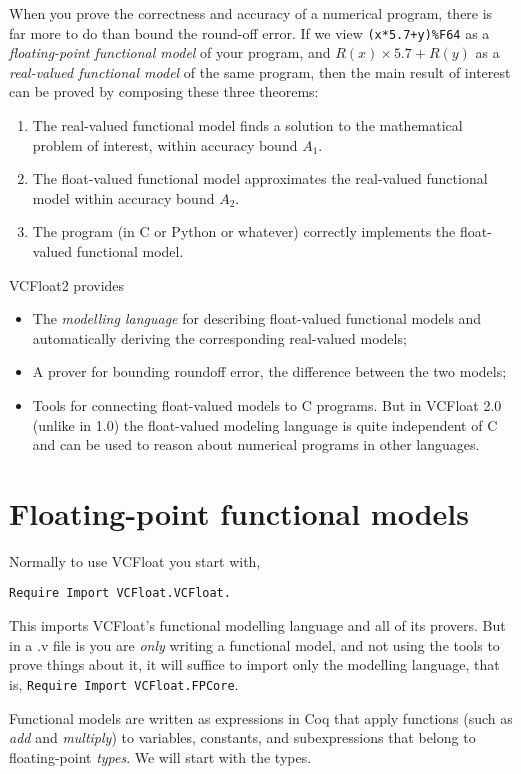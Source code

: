 \documentclass{llncs}
\begin{document}
When you prove the correctness and accuracy of a numerical program,
there is far more to do than bound the round-off error.
If we view \lstinline{(x*5.7+y)%F64} as a \emph{floating-point functional model}
  of your program, and $R(x)\times 5.7+R(y)$ as a
  \emph{real-valued functional model} of the same program, then
  the main result of interest can be proved by composing
  these three theorems:
\begin{enumerate}
  \item The real-valued functional model finds a solution to
    the mathematical problem of interest, within accuracy bound $A_1$.
  \item The float-valued functional model approximates the
    real-valued functional model within accuracy bound $A_2$.
  \item The program (in C or Python or whatever) correctly implements
    the float-valued functional model.
\end{enumerate}
VCFloat2 provides
\begin{itemize}
\item The \emph{modelling language} for describing float-valued functional
  models and automatically deriving the corresponding real-valued models;
\item A prover for bounding roundoff error, the difference between the two models;
\item Tools for connecting float-valued models to C programs.  But
  in VCFloat 2.0 (unlike in 1.0) the float-valued modeling language
  is quite independent of C and can be used to reason about numerical
  programs in other languages.
\end{itemize}

\section{Floating-point functional models}
Normally to use VCFloat you start with,
\begin{lstlisting}
Require Import VCFloat.VCFloat.
\end{lstlisting}
This imports VCFloat's functional modelling language and all of its
provers.  But in a .v file is you are \emph{only} writing a functional model,
and not using the tools to prove things about it, it will suffice
to import only the modelling language, that is, \lstinline{Require Import VCFloat.FPCore}.

Functional models are written as expressions in Coq that apply
functions (such as \emph{add} and \emph{multiply}) to
variables, constants, and subexpressions that belong to floating-point
\emph{types}.  We will start with the types.
\end{document}
